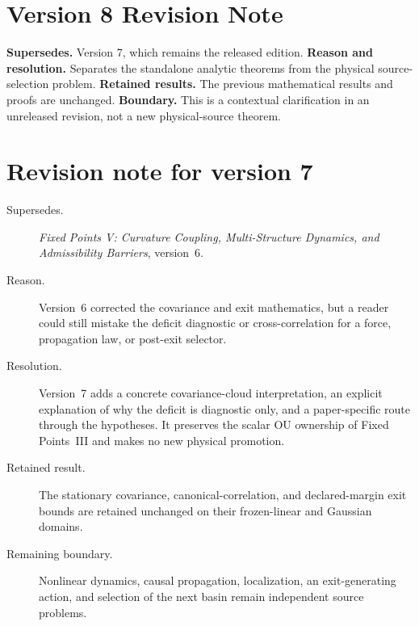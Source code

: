 \documentclass[11pt]{article}
\begin{document}
\section*{Version 8 Revision Note}
\noindent\textbf{Supersedes.} Version 7, which remains the released edition.
\textbf{Reason and resolution.} Separates the standalone analytic theorems from the physical source-selection problem.
\textbf{Retained results.} The previous mathematical results and proofs are unchanged.
\textbf{Boundary.} This is a contextual clarification in an unreleased revision,
not a new physical-source theorem.

\section*{Revision note for version 7}
\begin{description}
\item[Supersedes.] \emph{Fixed Points V: Curvature Coupling,
Multi-Structure Dynamics, and Admissibility Barriers}, version~6.
\item[Reason.] Version~6 corrected the covariance and exit mathematics, but a
reader could still mistake the deficit diagnostic or cross-correlation for a
force, propagation law, or post-exit selector.
\item[Resolution.] Version~7 adds a concrete covariance-cloud interpretation,
an explicit explanation of why the deficit is diagnostic only, and a
paper-specific route through the hypotheses. It preserves the scalar OU
ownership of Fixed Points~III and makes no new physical promotion.
\item[Retained result.] The stationary covariance, canonical-correlation, and
declared-margin exit bounds are retained unchanged on their frozen-linear and
Gaussian domains.
\item[Remaining boundary.] Nonlinear dynamics, causal propagation,
localization, an exit-generating action, and selection of the next basin
remain independent source problems.
\end{description}
\end{document}
